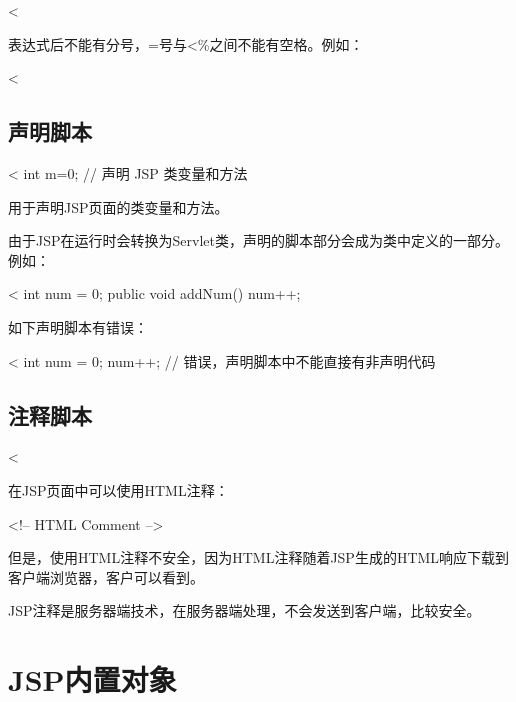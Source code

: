 \begin{jspCode}
  <%
\end{jspCode}


表达式后不能有分号，=号与<\%之间不能有空格。例如：

\begin{jspCode}
  <%
\end{jspCode}


\subsection{声明脚本}

\begin{jspCode}
  <%
    int m=0; // 声明 JSP 类变量和方法
\end{jspCode}

用于声明JSP页面的类变量和方法。

由于JSP在运行时会转换为Servlet类，声明的脚本部分会成为类中定义的一部分。
例如：

\begin{jspCode}
<%
  int num = 0;
  public void addNum() {
    num++;
  }
\end{jspCode}

如下声明脚本有错误：

\begin{jspCode}
<%
  int num = 0;
  num++; // 错误，声明脚本中不能直接有非声明代码
\end{jspCode}

\subsection{注释脚本}

\begin{jspCode}
  <%
\end{jspCode}

在JSP页面中可以使用HTML注释：

\begin{jspCode}
  <!-- HTML Comment -->
\end{jspCode}

{\kai\Red 但是，使用HTML注释不安全，因为HTML注释随着JSP生成的HTML响应下载到客户端浏览器，客户可以看到。}

JSP注释是服务器端技术，在服务器端处理，不会发送到客户端，比较安全。


\section{JSP内置对象} 


